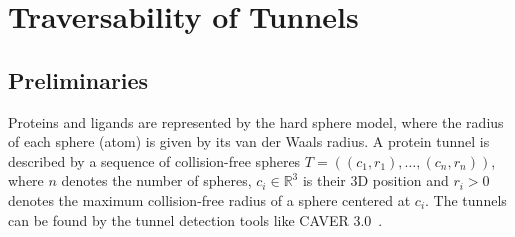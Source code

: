 \documentclass[usletter, 10pt, conference]{ieeeconf} %
\def\R{\mathbb{R}}
\begin{document}






\section{Traversability of Tunnels}

\subsection{Preliminaries}

Proteins and ligands are represented by the hard sphere model, where the radius of each sphere (atom) is given by its van der Waals radius.
A protein tunnel is described by a sequence of collision-free spheres 
$T=( (c_1, r_1),\ldots,(c_n,r_n) )$, where $n$ denotes the number of spheres,
$c_i \in \R^3$ is their 3D position and $r_i > 0$ denotes the maximum collision-free radius of a sphere centered at $c_i$. 
The tunnels can be found by the tunnel detection tools like CAVER 3.0~\cite{caver3}.
\end{document}
